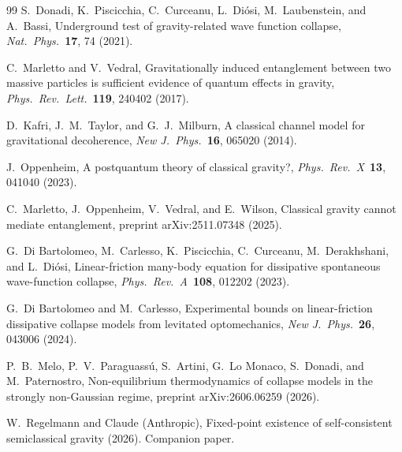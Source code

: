 \documentclass[12pt,a4paper]{article}
\theoremstyle{remark}
\begin{document}
\begin{thebibliography}{99}
 S.~Donadi, K.~Piscicchia, C.~Curceanu, L.~Di\'osi, M.~Laubenstein, and
A.~Bassi, Underground test of gravity-related wave function collapse,
\textit{Nat.\ Phys.}\ \textbf{17}, 74 (2021).

 C.~Marletto and V.~Vedral, Gravitationally induced entanglement
between two massive particles is sufficient evidence of quantum effects in gravity,
\textit{Phys.\ Rev.\ Lett.}\ \textbf{119}, 240402 (2017).

 D.~Kafri, J.~M.~Taylor, and G.~J.~Milburn, A classical channel model for
gravitational decoherence, \textit{New J.\ Phys.}\ \textbf{16}, 065020 (2014).

 J.~Oppenheim, A postquantum theory of classical gravity?,
\textit{Phys.\ Rev.\ X}\ \textbf{13}, 041040 (2023).

 C.~Marletto, J.~Oppenheim, V.~Vedral, and E.~Wilson,
Classical gravity cannot mediate entanglement,
preprint arXiv:2511.07348 (2025).

 G.~Di Bartolomeo, M.~Carlesso, K.~Piscicchia, C.~Curceanu,
M.~Derakhshani, and L.~Di\'osi, Linear-friction many-body equation for dissipative
spontaneous wave-function collapse, \textit{Phys.\ Rev.\ A}\ \textbf{108}, 012202 (2023).

 G.~Di Bartolomeo and M.~Carlesso, Experimental bounds on
linear-friction dissipative collapse models from levitated optomechanics,
\textit{New J.\ Phys.}\ \textbf{26}, 043006 (2024).

 P.~B.~Melo, P.~V.~Paraguass\'u, S.~Artini, G.~Lo Monaco,
S.~Donadi, and M.~Paternostro, Non-equilibrium thermodynamics of collapse models in the
strongly non-Gaussian regime, preprint arXiv:2606.06259 (2026).

 W.~Regelmann and Claude (Anthropic), Fixed-point existence of
self-consistent semiclassical gravity (2026). Companion paper.

\end{thebibliography}
\end{document}
